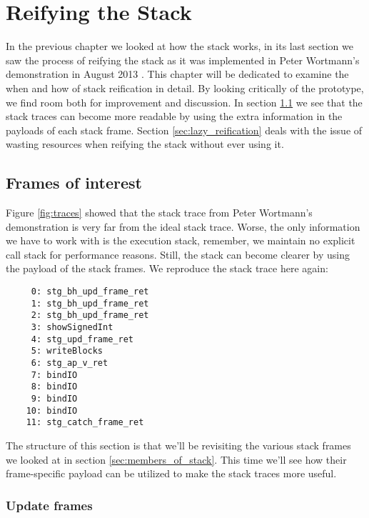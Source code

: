 \chapter{Reifying the Stack}

In the previous chapter we looked at how the stack works, in its
last section we saw the process of reifying the stack as it was
implemented in Peter Wortmann's demonstration in August 2013
\cite{stack_traces_ticket}. This chapter will be dedicated to examine
the when and how of stack reification in detail. By looking critically
of the prototype, we find room both for improvement and discussion.
In section \ref{sec:frames_of_interest} we see that the stack traces can become more
readable by using the extra information in the payloads of each stack
frame. Section \ref{sec:lazy_reification} deals with the issue of wasting
resources when reifying the stack without ever using it.

\section{Frames of interest} \label{sec:frames_of_interest}

Figure \ref{fig:traces} showed that the stack trace from Peter Wortmann's
demonstration is very far from the ideal stack trace.  Worse, the only
information we have to work with is the execution stack, remember, we maintain no
explicit call stack for performance reasons. Still, the stack can become
clearer by using the payload of the stack frames. We reproduce the stack trace here again:

\begin{verbatim}
     0: stg_bh_upd_frame_ret
     1: stg_bh_upd_frame_ret
     2: stg_bh_upd_frame_ret
     3: showSignedInt
     4: stg_upd_frame_ret
     5: writeBlocks
     6: stg_ap_v_ret
     7: bindIO
     8: bindIO
     9: bindIO
    10: bindIO
    11: stg_catch_frame_ret
\end{verbatim}

The structure of this section is that we'll be revisiting the various
stack frames we looked at in section \ref{sec:members_of_stack}. This
time we'll see how their frame-specific payload can be utilized to make
the stack traces more useful.

\subsection{Update frames} \label{sec:update_frames}

